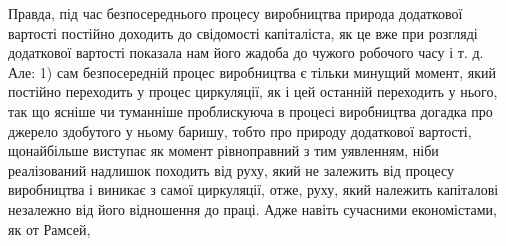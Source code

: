 Правда, під час безпосереднього процесу виробництва природа
додаткової вартості постійно доходить до свідомості капіталіста,
як це вже при розгляді додаткової вартості показала
нам його жадоба до чужого робочого часу і т. д. Але: 1) сам
безпосередній процес виробництва є тільки минущий момент,
який постійно переходить у процес циркуляції, як і цей останній
переходить у нього, так що ясніше чи туманніше проблискуюча
в процесі виробництва догадка про джерело здобутого у ньому
баришу, тобто про природу додаткової вартості, щонайбільше
виступає як момент рівноправний з тим уявленням, ніби реалізований
надлишок походить від руху, який не залежить від
процесу виробництва і виникає з самої циркуляції, отже, руху,
який належить капіталові незалежно від його відношення до
праці. Адже навіть сучасними економістами, як от Рамсей,
\parbreak{}  %
